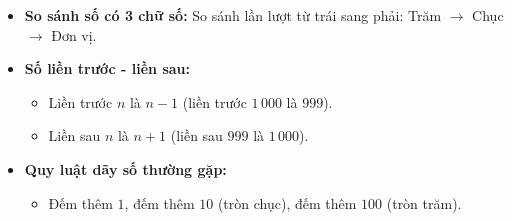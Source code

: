 \documentclass[10pt,a4paper]{article}
\begin{document}
\begin{minipage}[t]{0.49\textwidth}\vspace{0pt}
\begin{tcolorbox}[
  enhanced,
  colback=teal!4!white,
  colframe=teal!75!black,
  arc=2mm, boxrule=0.8pt,
  left=2mm, right=2mm, top=1.8mm, bottom=1.8mm,
  title={\footnotesize\bfseries\color{white}\faSliders\ 2. Kĩ năng so sánh và quy luật dãy số}
]
{\footnotesize
\begin{itemize}\setlength{\itemsep}{1pt}\setlength{\leftskip}{-2.5mm}
  \item \textbf{So sánh số có 3 chữ số:} So sánh lần lượt từ trái sang phải: Trăm $\to$ Chục $\to$ Đơn vị.
  \item \textbf{Số liền trước - liền sau:}
  \begin{itemize}\setlength{\itemsep}{0.5pt}\setlength{\leftskip}{-2mm}
    \item Liền trước $n$ là $n - 1$ (liền trước $1\,000$ là $999$).
    \item Liền sau $n$ là $n + 1$ (liền sau $999$ là $1\,000$).
  \end{itemize}
  \item \textbf{Quy luật dãy số thường gặp:}
  \begin{itemize}\setlength{\itemsep}{0.5pt}\setlength{\leftskip}{-2mm}
    \item Đếm thêm $1$, đếm thêm $10$ (tròn chục), đếm thêm $100$ (tròn trăm).
  \end{itemize}
\end{itemize}
}
\end{tcolorbox}
\end{minipage}
\end{document}
